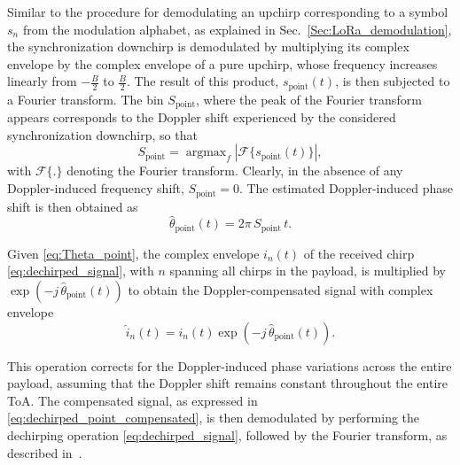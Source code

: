 \documentclass{IEEEtran}
\DeclareMathOperator*{\argmax}{argmax}
\begin{document}
Similar to the procedure for demodulating an upchirp corresponding to a symbol $s_n$ from the modulation alphabet, as explained in Sec.~\ref{Sec:LoRa_demodulation}, the synchronization downchirp is demodulated by multiplying its complex envelope by the complex envelope of a pure upchirp, whose frequency increases linearly from $-\frac{B}{2}$ to $ \frac{B}{2}$.
The result of this product, $s_{\text{point}}(t)$, is then subjected to a Fourier transform. The bin $S_{\text{point}}$, where the peak of the Fourier transform appears corresponds to the Doppler shift experienced by the considered synchronization downchirp, so that
\begin{equation}
    S_{\text{point}} = \argmax_{f} \left| \mathcal{F} \{s_{\text{point}}(t) \} \right|,
\end{equation}
with  $\mathcal{F}\{.\}$ denoting the Fourier transform. Clearly, in the absence of any Doppler-induced frequency shift, $S_{\text{point}}=0$.
The estimated Doppler-induced phase shift is then obtained as
\begin{equation}
\label{eq:Theta_point}
    \hat{\theta}_{\mathrm{point}}(t) = 2\pi\,S_\text{point}\,t.
\end{equation}

Given \eqref{eq:Theta_point}, the complex envelope $i_n(t)$ of the received chirp \eqref{eq:dechirped_signal}, with $n$ spanning all chirps in the payload, is multiplied by $\exp\left(-j \, \hat{\theta}_{\mathrm{point}}(t)\right)$ to obtain the Doppler-compensated signal with complex envelope
\begin{equation}  
\label{eq:dechirped_point_compensated}
   \hat{i}_n(t) = i_n(t) \exp\left(-j \, \hat{\theta}_{\mathrm{point}}(t)\right).
\end{equation}  


This operation corrects for the Doppler-induced phase variations across the entire payload, assuming that the Doppler shift remains constant throughout the entire \ac{ToA}. The compensated signal, as expressed in \eqref{eq:dechirped_point_compensated}, is then demodulated by performing the dechirping operation \eqref{eq:dechirped_signal}, followed by the Fourier transform, as described in~\cite{Pasolini.2022}.
\end{document}
